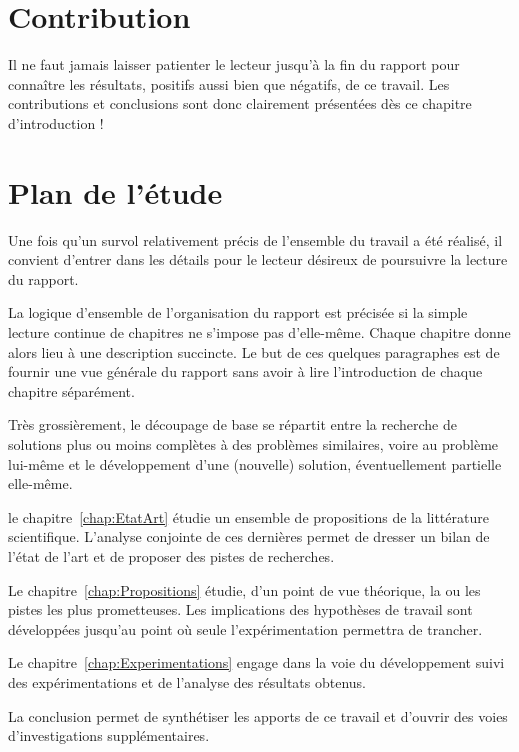 \documentclass[11pt, french]{report-rd-info}
\begin{document}
\section{Contribution}

Il ne faut jamais laisser patienter le lecteur jusqu'à la fin du rapport pour connaître les résultats, positifs aussi bien que négatifs, de ce travail. Les contributions et conclusions sont donc clairement présentées dès ce chapitre d'introduction !

\section{Plan de l'étude}

Une fois qu'un survol relativement précis de l'ensemble du travail a été réalisé, il convient d'entrer dans les détails pour le lecteur désireux de poursuivre la lecture du rapport.

La logique d'ensemble de l'organisation du rapport est précisée si la simple lecture continue de chapitres ne s'impose pas d'elle-même. Chaque chapitre donne alors lieu à une description succincte. Le but de ces quelques paragraphes est de fournir une vue générale du rapport sans avoir à lire l'introduction de chaque chapitre séparément.

Très grossièrement, le découpage de base se répartit entre la recherche de solutions plus ou moins complètes à des problèmes similaires, voire au problème lui-même et le développement d'une (nouvelle) solution, éventuellement partielle elle-même.

le chapitre~\ref{chap:EtatArt} étudie un ensemble de propositions de la littérature scientifique. L'analyse conjointe de ces dernières permet de dresser un bilan de l'état de l'art et de proposer des pistes de recherches.

Le chapitre~\ref{chap:Propositions} étudie, d'un point de vue théorique, la ou les pistes les plus prometteuses. Les implications des hypothèses de travail sont développées jusqu'au point où seule l'expérimentation permettra de trancher.

Le chapitre~\ref{chap:Experimentations} engage dans la voie du développement suivi des expérimentations et de l'analyse des résultats obtenus.

La conclusion permet de synthétiser les apports de ce travail et d'ouvrir des voies d'investigations supplémentaires.

\end{document}
